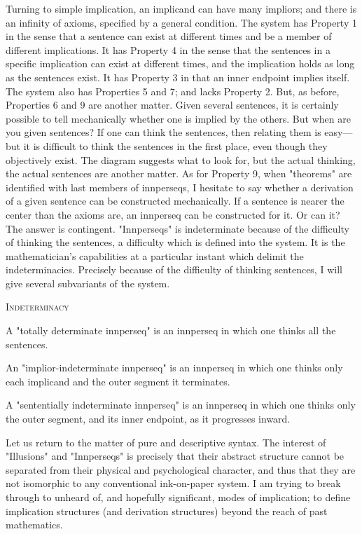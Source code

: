 Turning to simple implication, an implicand can have many impliors; 
and there is an infinity of axioms, specified by a general condition. The 
system has Property 1 in the sense that a sentence can exist at different 
times and be a member of different implications. It has Property 4 in the 
sense that the sentences in a specific implication can exist at different times, 
and the implication holds as long as the sentences exist. It has Property 3 in 
that an inner endpoint implies itself. The system also has Properties 5 and 7; 
and lacks Property 2. But, as before, Properties 6 and 9 are another matter. 
Given several sentences, it is certainly possible to tell mechanically whether 
one is implied by the others. But when are you given sentences? If one can 
think the sentences, then relating them is easy---but it is difficult to think the 
sentences in the first place, even though they objectively exist. The diagram 
suggests what to look for, but the actual thinking, the actual sentences are 
another matter. As for Property 9, when "theorems" are identified with last 
members of innperseqs, I hesitate to say whether a derivation of a given 
sentence can be constructed mechanically. If a sentence is nearer the center 
than the axioms are, an innperseq can be constructed for it. Or can it? The 
answer is contingent. "Innperseqs" is indeterminate because of the difficulty 
of thinking the sentences, a difficulty which is defined into the system. It is 
the mathematician's capabilities at a particular instant which delimit the 
indeterminacies. Precisely because of the difficulty of thinking sentences, I 
will give several subvariants of the system. 

{ \centering \large \textsc{Indeterminacy} \par}
\begin{sysrules}
A "totally determinate innperseq" is an innperseq in which one thinks all the 
sentences. 

An "implior-indeterminate innperseq" is an innperseq in which one thinks 
only each implicand and the outer segment it terminates. 

A "sententially indeterminate innperseq" is an innperseq in which one thinks 
only the outer segment, and its inner endpoint, as it progresses 
inward. 
\end{sysrules}


Let us return to the matter of pure and descriptive syntax. The interest 
of "Illusions" and "Innperseqs" is precisely that their abstract structure 
cannot be separated from their physical and psychological character, and 
thus that they are not isomorphic to any conventional ink-on-paper system. I 
am trying to break through to unheard of, and hopefully significant, modes 
of implication; to define implication structures (and derivation structures) 
beyond the reach of past mathematics. 

